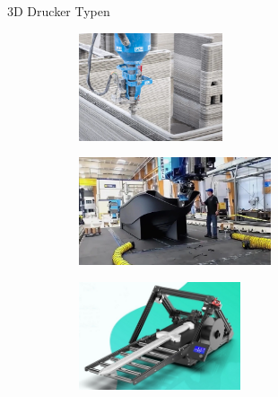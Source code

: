 \begin{frame}{3D Drucker Typen}
    \begin{figure}[t]
        \centering
        \begin{minipage}[m]{0.49\textwidth}
        \begin{figure}
            \centering
            \includegraphics[height=90pt]{img_niklas/3dhouse.png}
            \label{fig:my_label}
        \end{figure}
        \end{minipage}
        \begin{minipage}[m]{0.49\textwidth}
         \begin{figure}
            \centering
            \includegraphics[height=90pt]{img_niklas/3dboat.png}
            \label{fig:my_label}
        \end{figure}
        \end{minipage}
    \end{figure}
     \begin{figure}[b]
        \centering
        \begin{minipage}[m]{0.49\textwidth}
        \begin{figure}
            \centering
            \includegraphics[height=90pt]{img_niklas/creality-cr30-3dprintmill-1.jpg}
            \label{fig:my_label}
        \end{figure}
        \end{minipage}
        \begin{minipage}[m]{0.49\textwidth}

\end{minipage}
\end{figure}
\end{frame}
